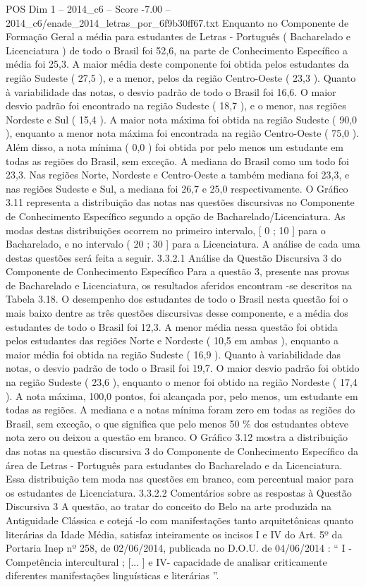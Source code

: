 \begin{textsample}{POS Dim 1 – 2014\_c6 – Score -7.00 – 2014\_c6/enade\_2014\_letras\_por\_6f9b30ff67.txt}
Enquanto no Componente de Formação Geral a média para estudantes de Letras - Português ( Bacharelado e Licenciatura ) de todo o Brasil foi 52,6, na parte de Conhecimento Específico a média foi 25,3.
A maior média deste componente foi obtida pelos estudantes da região Sudeste ( 27,5 ), e a menor, pelos da região Centro-Oeste ( 23,3 ).
Quanto à variabilidade das notas, o desvio padrão de todo o Brasil foi 16,6.
O maior desvio padrão foi encontrado na região Sudeste ( 18,7 ), e o menor, nas regiões Nordeste e Sul ( 15,4 ).
A maior nota máxima foi obtida na região Sudeste ( 90,0 ), enquanto a menor nota máxima foi encontrada na região Centro-Oeste ( 75,0 ).
Além disso, a nota mínima ( 0,0 ) foi obtida por pelo menos um estudante em todas as regiões do Brasil, sem exceção.
A mediana do Brasil como um todo foi 23,3.
Nas regiões Norte, Nordeste e Centro-Oeste a também mediana foi 23,3, e nas regiões Sudeste e Sul, a mediana foi 26,7 e 25,0 respectivamente.
O Gráfico 3.11 representa a distribuição das notas nas questões discursivas no Componente de Conhecimento Específico segundo a opção de Bacharelado/Licenciatura.
As modas destas distribuições ocorrem no primeiro intervalo, [ 0 ; 10 ] para o Bacharelado, e no intervalo ( 20 ; 30 ] para a Licenciatura.
A análise de cada uma destas questões será feita a seguir. 3.3.2.1 Análise da Questão Discursiva 3 do Componente de Conhecimento Específico Para a questão 3, presente nas provas de Bacharelado e Licenciatura, os resultados aferidos encontram -se descritos na Tabela 3.18.
O desempenho dos estudantes de todo o Brasil nesta questão foi o mais baixo dentre as três questões discursivas desse componente, e a média dos estudantes de todo o Brasil foi 12,3.
A menor média nessa questão foi obtida pelos estudantes das regiões Norte e Nordeste ( 10,5 em ambas ), enquanto a maior média foi obtida na região Sudeste ( 16,9 ).
Quanto à variabilidade das notas, o desvio padrão de todo o Brasil foi 19,7.
O maior desvio padrão foi obtido na região Sudeste ( 23,6 ), enquanto o menor foi obtido na região Nordeste ( 17,4 ).
A nota máxima, 100,0 pontos, foi alcançada por, pelo menos, um estudante em todas as regiões.
A mediana e a notas mínima foram zero em todas as regiões do Brasil, sem exceção, o que significa que pelo menos 50 \% dos estudantes obteve nota zero ou deixou a questão em branco.
O Gráfico 3.12 mostra a distribuição das notas na questão discursiva 3 do Componente de Conhecimento Específico da área de Letras - Português para estudantes do Bacharelado e da Licenciatura.
Essa distribuição tem moda nas questões em branco, com percentual maior para os estudantes de Licenciatura. 3.3.2.2 Comentários sobre as respostas à Questão Discursiva 3 A questão, ao tratar do conceito do Belo na arte produzida na Antiguidade Clássica e cotejá -lo com manifestações tanto arquitetônicas quanto literárias da Idade Média, satisfaz inteiramente os incisos I e IV do Art. 5º da Portaria Inep nº 258, de 02/06/2014, publicada no D.O.U. de 04/06/2014 : “ I - Competência intercultural ; [... ] e IV- capacidade de analisar criticamente diferentes manifestações linguísticas e literárias ”.

\end{textsample}
